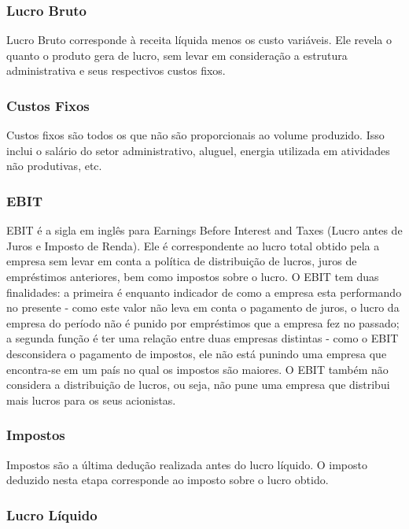 \documentclass[12pt]{article}
\begin{document}
\subsubsection{Lucro Bruto}

	Lucro Bruto corresponde à receita líquida menos os custo variáveis. Ele revela o quanto o produto gera de lucro, sem levar em consideração a estrutura administrativa e seus respectivos custos fixos.

\subsubsection{Custos Fixos}

	Custos fixos são todos os que não são proporcionais ao volume produzido. Isso inclui o salário do setor administrativo, aluguel, energia utilizada em atividades não produtivas, etc.

\subsubsection{EBIT}

	EBIT é a sigla em inglês para Earnings Before Interest and Taxes (Lucro antes de Juros e Imposto de Renda). Ele é correspondente ao lucro total obtido pela a empresa sem levar em conta a política de distribuição de lucros, juros de empréstimos anteriores, bem como impostos sobre o lucro. O EBIT tem duas finalidades: a primeira é enquanto indicador de como a empresa esta performando no presente - como este valor não leva em conta o pagamento de juros, o lucro da empresa do período não é punido por empréstimos que a empresa fez no passado; a segunda função é ter uma relação entre duas empresas distintas - como o EBIT desconsidera o pagamento de impostos, ele não está punindo uma empresa que encontra-se em um país no qual os impostos são maiores. O EBIT também não considera a distribuição de lucros, ou seja, não pune uma empresa que distribui mais lucros para os seus acionistas.

\subsubsection{Impostos}

	Impostos são a última dedução realizada antes do lucro líquido. O imposto deduzido nesta etapa corresponde ao imposto sobre o lucro obtido.

\subsubsection{Lucro Líquido}
\end{document}
